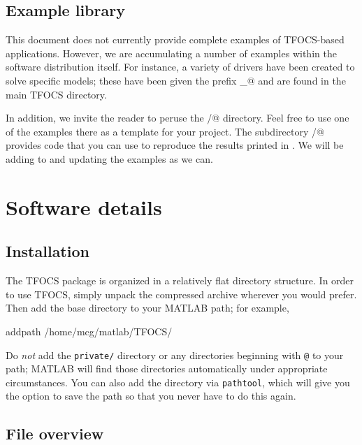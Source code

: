 \documentclass{article}
\begin{document}
\subsection{Example library}

This document does not currently provide complete examples
of TFOCS-based applications. However, we are accumulating a number of examples
within the software distribution itself. For instance,
a variety of drivers have been created to solve specific models;
these have been given the prefix \verb@solver_@ and are found in
the main TFOCS directory. 

In addition, we invite the reader
to peruse the \verb@examples/@ directory.
Feel free to use one of the examples there as
a template for your project. The subdirectory \verb@paper/@
provides code that you can use to reproduce the results printed in \cite{TFOCS}.
We will be adding to and updating the examples as we can.

\section{Software details}
\label{sec:software}

\subsection{Installation}

The TFOCS package is organized in a relatively flat directory
structure. In order to use TFOCS, simply unpack the compressed 
archive wherever you would prefer. Then add the base directory to your
MATLAB path; for example,
\begin{code}
	addpath /home/mcg/matlab/TFOCS/
\end{code}
Do \emph{not} add the \verb+private/+ directory or any directories beginning
with \verb+@+ to your path; MATLAB will find those directories automatically
under appropriate circumstances.
You can also add the directory via \verb+pathtool+, which will give you the option
to save the path so that you never have to do this again.

\subsection{File overview}
\end{document}
